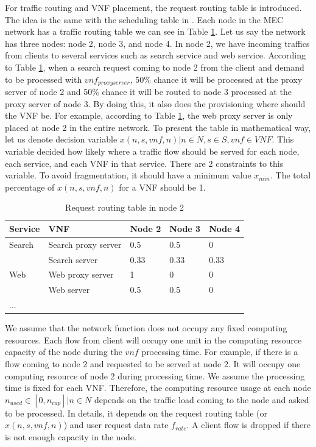 \documentclass[conference]{IEEEtran}
\begin{document}
For traffic routing and VNF placement, the request routing table is introduced. The idea is the same with the scheduling table in \cite{9269087}. Each node in the MEC network has a traffic routing table we can see in Table \ref{tbl:traffic_routing}. Let us say the network has three nodes: node 2, node 3, and node 4. In node 2, we have incoming traffics from clients to several services such as search service and web service. According to Table \ref{tbl:traffic_routing}, when a search request coming to node 2 from the client and demand to be processed with $vnf_{proxy server}$, 50\% chance it will be processed at the proxy server of node 2 and 50\% chance it will be routed to node 3 processed at the proxy server of node 3. By doing this, it also does the provisioning where should the VNF be. For example, according to Table \ref{tbl:traffic_routing}, the web proxy server is only placed at node 2 in the entire network. To present the table in mathematical way, let us denote decision variable $x(n,s,vnf,n) | n \in N, s \in S, vnf \in VNF$. This variable decided how likely where a traffic flow should be served for each node, each service, and each VNF in that service. There are 2 constraints to this variable. To avoid fragmentation, it should have a minimum value $x_{min}$. The total percentage of $x(n,s,vnf,n)$ for a VNF should be 1.

\begin{table}[]
    \centering
    \caption{Request routing table in node 2}
    \begin{tabular}{|l|l|l|l|l|}
    \hline
    Service & VNF                 & Node 2 & Node 3 & Node 4 \\ \hline
    Search  & Search proxy server & 0.5    & 0.5    & 0      \\ \hline
            & Search server       & 0.33   & 0.33   & 0.33   \\ \hline
    Web     & Web proxy server    & 1      & 0      & 0      \\ \hline
            & Web server          & 0.5    & 0.5    & 0      \\ \hline
    ...     &                     &        &        &        \\ \hline
    \end{tabular}
    \label{tbl:traffic_routing}
\end{table}

We assume that the network function does not occupy any fixed computing resources. Each flow from client will occupy one unit in the computing resource capacity of the node during the $vnf$ processing time. For example, if there is a flow coming to node 2 and requested to be served at node 2. It will occupy one computing resource of node 2 during processing time. We assume the processing time is fixed for each VNF. Therefore, the computing resource usage at each node $n_{used} \in [0, n_{cap}] | n \in N$ depends on the traffic load coming to the node and asked to be processed. In details, it depends on the request routing table (or $x(n,s,vnf,n)$) and user request data rate $f_{rate}$. A client flow is dropped if there is not enough capacity in the node.
\end{document}
